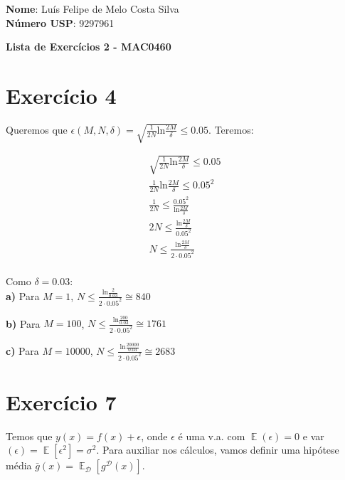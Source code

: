\documentclass[12pt,letterpaper]{article}
\DeclareMathOperator{\expv}{\mathbb{E}}
\DeclareMathOperator{\data}{\mathcal{D}}
\begin{document}
	
	\textbf{Nome}: Luís Felipe de Melo Costa Silva \\
	\textbf{Número USP}: 9297961 
	
	\begin{center}
		\LARGE \bf
		Lista de Exercícios 2 - MAC0460
	\end{center}
	
	\section*{Exercício 4}
	
	Queremos que $\epsilon(M, N, \delta) = \sqrt{\frac{1}{2N} \text{ln} \frac{2M}{\delta}} \leq 0.05$. Teremos:
	
	\begin{multicols}{2}
		\begin{equation*}
			\begin{split}
				\sqrt{\frac{1}{2N} \text{ln} \frac{2M}{\delta}} \leq 0.05 \\
				\frac{1}{2N} \text{ln} \frac{2M}{\delta} \leq 0.05^2 \\
				\frac{1}{2N} \leq \frac{0.05^2}{\text{ln} \frac{2M}{\delta}} \\
				2N \leq \frac{\text{ln} \frac{2M}{\delta}}{0.05^2} \\
				N \leq \frac{\text{ln} \frac{2M}{\delta}}{2 \cdot 0.05^2} \\
			\end{split}
		\end{equation*}
		
		Como $\delta = 0.03$: \\
		
		\textbf{a)} Para $M = 1$, $N \leq \frac{\text{ln} \frac{2}{0.03}}{2 \cdot 0.05^2} \cong 840$
		
		\textbf{b)} Para $M = 100$, $N \leq \frac{\text{ln} \frac{200}{0.03}}{2 \cdot 0.05^2} \cong 1761$
		
		\textbf{c)} Para $M = 10000$, $N \leq \frac{\text{ln} \frac{20000}{0.03}}{2 \cdot 0.05^2} \cong 2683$
		
	\end{multicols}
	
	\section*{Exercício 7}
	
	Temos que $ y(x) = f(x) + \epsilon$, onde $ \epsilon $ é uma v.a. com $ \expv(\epsilon) = 0 $ e  var$(\epsilon) = \expv[\epsilon^2] = \sigma^2 $. Para auxiliar nos cálculos, vamos definir uma hipótese média $\bar{g}(x) = \expv_{\data}[g^{\data}(x)]$.
	
\end{document}
